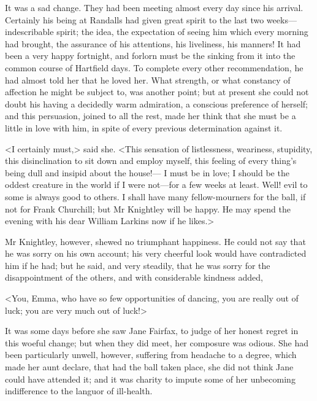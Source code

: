 It was a sad change. They had been meeting almost every day since his arrival. Certainly his being at Randalls had given great spirit to the last two weeks—indescribable spirit; the idea, the expectation of seeing him which every morning had brought, the assurance of his attentions, his liveliness, his manners! It had been a very happy fortnight, and forlorn must be the sinking from it into the common course of Hartfield days. To complete every other recommendation, he had almost told her that he loved her. What strength, or what constancy of affection he might be subject to, was another point; but at present she could not doubt his having a decidedly warm admiration, a conscious preference of herself; and this persuasion, joined to all the rest, made her think that she must be a little in love with him, in spite of every previous determination against it.

<I certainly must,> said she. <This sensation of listlessness, weariness, stupidity, this disinclination to sit down and employ myself, this feeling of every thing's being dull and insipid about the house!— I must be in love; I should be the oddest creature in the world if I were not—for a few weeks at least. Well! evil to some is always good to others. I shall have many fellow-mourners for the ball, if not for Frank Churchill; but Mr Knightley will be happy. He may spend the evening with his dear William Larkins now if he likes.>

Mr Knightley, however, shewed no triumphant happiness. He could not say that he was sorry on his own account; his very cheerful look would have contradicted him if he had; but he said, and very steadily, that he was sorry for the disappointment of the others, and with considerable kindness added,

<You, Emma, who have so few opportunities of dancing, you are really out of luck; you are very much out of luck!>

It was some days before she saw Jane Fairfax, to judge of her honest regret in this woeful change; but when they did meet, her composure was odious. She had been particularly unwell, however, suffering from headache to a degree, which made her aunt declare, that had the ball taken place, she did not think Jane could have attended it; and it was charity to impute some of her unbecoming indifference to the languor of ill-health.


